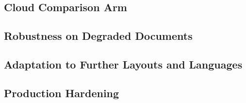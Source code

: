 \subsection{Cloud Comparison Arm}
\label{sec:fw-cloud}

\subsection{Robustness on Degraded Documents}
\label{sec:fw-robustness}

\subsection{Adaptation to Further Layouts and Languages}
\label{sec:fw-transfer}

\subsection{Production Hardening}
\label{sec:fw-production}

